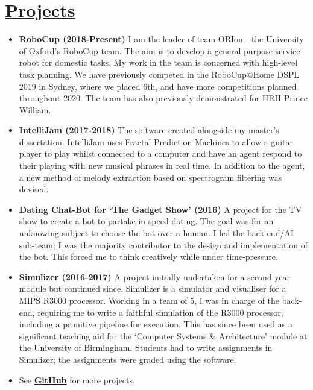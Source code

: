 \documentclass[11pt]{article}
\begin{document}
	\vspace{-10pt}
	\hspace{-100pt}\section*{\underline{Projects}} %
			\begin{itemize}
			        \item \textbf{RoboCup (2018-Present)} I am the leader of team ORIon - the University of Oxford's RoboCup team. The aim is to develop a general purpose service robot for domestic tasks. My work in the team is concerned with high-level task planning. We have previously competed in the RoboCup@Home DSPL $2019$ in Sydney, where we placed $6$th, and have more competitions planned throughout $2020$. The team has also previously demonstrated for HRH Prince William. 
				\item \textbf{IntelliJam (2017-2018)} The software created alongside my master's dissertation. IntelliJam uses Fractal Prediction Machines to allow a guitar player to play whilst connected to a computer and have an agent respond to their playing with new musical phrases in real time. In addition to the agent, a new method of melody extraction based on spectrogram filtering was devised.
				\item \textbf{Dating Chat-Bot for `The Gadget Show' (2016)} A project for the TV show to create a bot to partake in speed-dating. The goal was for an unknowing subject to choose the bot over a human. I led the back-end/AI sub-team; I was the majority contributor to the design and implementation of the bot. This forced me to think creatively while under time-pressure.
				\item \textbf{Simulizer (2016-2017)} A project initially undertaken for a second year module but continued since. Simulizer is a simulator and visualiser for a MIPS R3000 processor. Working in a team of 5, I was in charge of the back-end, requiring me to write a faithful simulation of the R3000 processor, including a primitive pipeline for execution. This has since been used as a significant teaching aid for the `Computer Systems \& Architecture' module at the University of Birmingham. Students had to write assignments in Simulizer; the assignments were graded using the software. 
				\item See \textbf{\href{https://github.com/charlie1329/}{GitHub}} for more projects.
			\end{itemize}
        \iffalse
	\vspace{-20pt}
\end{document}
